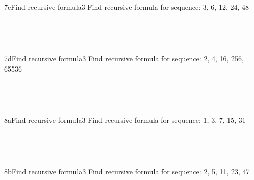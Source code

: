 \documentclass[a4paper,12pt]{book}
\begin{document}
    ~\\
    
    \hrulefill
    
    ~\\
    \begin{answersheetquestion}{7c}{Find recursive formula}{3}
        Find recursive formula for sequence: 3, 6, 12, 24, 48
        \iftoggle{answerkey}{ \begin{answer} $a_{n} = 2 \cdot a_{n-1}$ \end{answer} }{ { ~\\ \raisebox{0pt}[2cm][0pt]{  } } }
    \end{answersheetquestion}

    ~\\
    
    \hrulefill
    
    ~\\
    \begin{answersheetquestion}{7d}{Find recursive formula}{3}
        Find recursive formula for sequence: 2, 4, 16, 256, 65536
        \iftoggle{answerkey}{ \begin{answer} $a_{n} = (a_{n-1})^{2}$ \end{answer} }{ { ~\\ \raisebox{0pt}[2cm][0pt]{  } } }
    \end{answersheetquestion}

    ~\\
    
    \hrulefill
    
    ~\\
    \begin{answersheetquestion}{8a}{Find recursive formula}{3}
        Find recursive formula for sequence: 1, 3, 7, 15, 31
        \iftoggle{answerkey}{ \begin{answer} $a_{n} = 2 \cdot a_{n-1} + 1$ \end{answer} }{ { ~\\ \raisebox{0pt}[2cm][0pt]{  } } }
    \end{answersheetquestion}

    ~\\
    
    \hrulefill
    
    ~\\
    \begin{answersheetquestion}{8b}{Find recursive formula}{3}
        Find recursive formula for sequence: 2, 5, 11, 23, 47
        \iftoggle{answerkey}{ \begin{answer} $a_{n} = 2 \cdot a_{n-1} + 1$ \end{answer} }{ { ~\\ \raisebox{0pt}[2cm][0pt]{  } } }
    \end{answersheetquestion}
\end{document}
